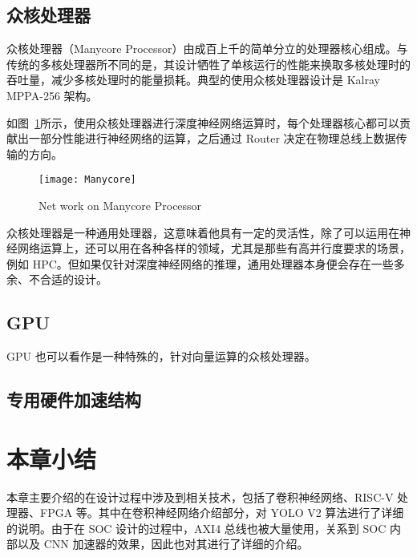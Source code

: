 \subsection{众核处理器}

众核处理器（Manycore Processor）由成百上千的简单分立的处理器核心组成。与传统的多核处理器所不同的是，其设计牺牲了单核运行的性能来换取多核处理时的吞吐量，减少多核处理时的能量损耗。典型的使用众核处理器设计是 Kalray MPPA-256 架构。

如图~\ref{fig:Manycore}所示，使用众核处理器进行深度神经网络运算时，每个处理器核心都可以贡献出一部分性能进行神经网络的运算，之后通过 Router 决定在物理总线上数据传输的方向。

\begin{figure}[!htbp]
    \centering
    \texttt{[image: Manycore]}
    \caption{Net work on Manycore Processor}
    \label{fig:Manycore}
\end{figure}

众核处理器是一种通用处理器，这意味着他具有一定的灵活性，除了可以运用在神经网络运算上，还可以用在各种各样的领域，尤其是那些有高并行度要求的场景，例如 HPC。但如果仅针对深度神经网络的推理，通用处理器本身便会存在一些多余、不合适的设计。 

\subsection{GPU}

GPU 也可以看作是一种特殊的，针对向量运算的众核处理器。

\subsection{专用硬件加速结构}

\section{本章小结}

本章主要介绍的在设计过程中涉及到相关技术，包括了卷积神经网络、RISC-V 处理器、FPGA 等。其中在卷积神经网络介绍部分，对 YOLO V2 算法进行了详细的说明。由于在 SOC 设计的过程中，AXI4 总线也被大量使用，关系到 SOC 内部以及 CNN 加速器的效果，因此也对其进行了详细的介绍。
